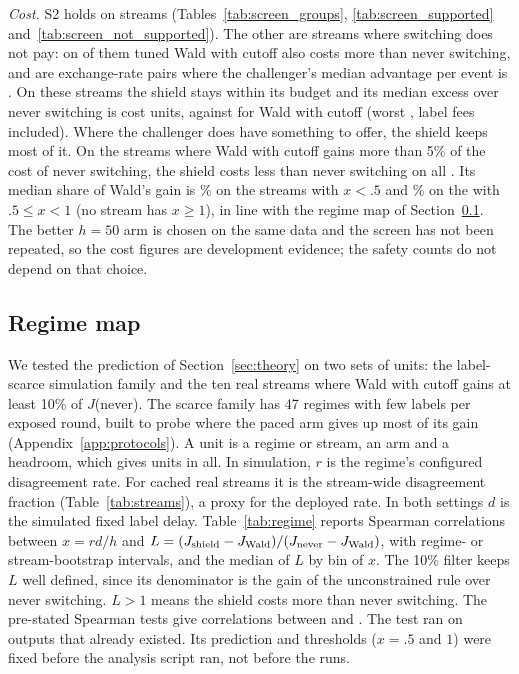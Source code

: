 \documentclass[10pt]{article}
\theoremstyle{plain}
\theoremstyle{definition}
\begin{document}
\emph{Cost.} S2 holds on \ScreenSupported{} streams (Tables~\ref{tab:screen_groups}, \ref{tab:screen_supported} and~\ref{tab:screen_not_supported}). The other \ScreenNotSupported{} are streams where switching does not pay: on \ScreenLoseWaldAlso{} of them tuned Wald with cutoff also costs more than never switching, and \ScreenOtherForex{} are exchange-rate pairs where the challenger's median advantage per event is \ScreenForexAdv. On these streams the shield stays within its budget and its median excess over never switching is \ScreenLoseShieldMed{} cost units, against \ScreenLoseWaldMed{} for Wald with cutoff (worst \ScreenWorstExcess, label fees included). Where the challenger does have something to offer, the shield keeps most of it. On the \ScreenGainful{} streams where Wald with cutoff gains more than 5\% of the cost of never switching, the shield costs less than never switching on all \ScreenGainfulShieldBeatsNever. Its median share of Wald's gain is \ScreenKeepLo\% on the \ScreenGainfulLo{} streams with $x<.5$ and \ScreenKeepMid\% on the \ScreenGainfulMid{} with $.5\le x<1$ (no stream has $x\ge1$), in line with the regime map of Section~\ref{sec:regimemap}. The better $h=50$ arm is chosen on the same data and the screen has not been repeated, so the cost figures are development evidence; the safety counts do not depend on that choice.

\subsection{Regime map}\label{sec:regimemap}
We tested the prediction of Section~\ref{sec:theory} on two sets of units: the label-scarce simulation family and the ten real streams where Wald with cutoff gains at least 10\% of $J$(never). The scarce family has 47 regimes with few labels per exposed round, built to probe where the paced arm gives up most of its gain (Appendix~\ref{app:protocols}). A unit is a regime or stream, an arm and a headroom, which gives \NUnits{} units in all. In simulation, $r$ is the regime's configured disagreement rate. For cached real streams it is the stream-wide disagreement fraction (Table~\ref{tab:streams}), a proxy for the deployed rate. In both settings $d$ is the simulated fixed label delay. Table~\ref{tab:regime} reports Spearman correlations between $x=rd/h$ and $L=(J_{\rm shield}-J_{\rm Wald})/(J_{\rm never}-J_{\rm Wald})$, with regime- or stream-bootstrap intervals, and the median of $L$ by bin of $x$. The 10\% filter keeps $L$ well defined, since its denominator is the gain of the unconstrained rule over never switching. $L>1$ means the shield costs more than never switching.
The pre-stated Spearman tests give correlations between \SpearLo{} and \SpearHi. The test ran on outputs that already existed. Its prediction and thresholds ($x=.5$ and $1$) were fixed before the analysis script ran, not before the runs.
\end{document}
